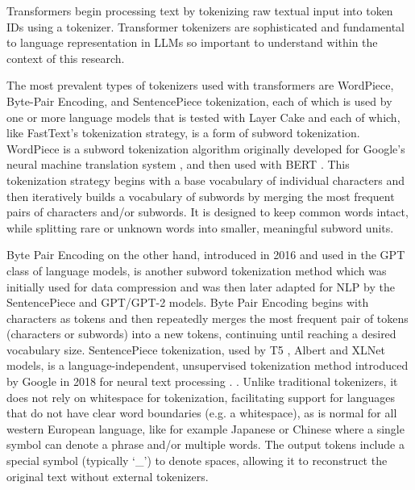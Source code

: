 \documentclass[final]{clv2025}
\begin{document}
Transformers begin processing text by tokenizing raw textual input into token IDs using a tokenizer. Transformer tokenizers are sophisticated and fundamental to language representation in LLMs so important to understand within the context of this research. 

The most prevalent types of tokenizers used with transformers are WordPiece, Byte-Pair Encoding, and SentencePiece tokenization, each of which is used by one or more language models that is tested with Layer Cake and each of which, like FastText’s tokenization strategy, is a form of subword tokenization. WordPiece is a subword tokenization algorithm originally developed for Google’s neural machine translation system \cite{schuster} \cite{wu}, and then used with BERT \cite{devlin-etal-2019-bert}. This tokenization strategy begins with a base vocabulary of individual characters and then iteratively builds a vocabulary of subwords by merging the most frequent pairs of characters and/or subwords. It is designed to keep common words intact, while splitting rare or unknown words into smaller, meaningful subword units. 

Byte Pair Encoding on the other hand, introduced in 2016 \cite{sennrich-etal-2016-neural} and used in the GPT class of language models, is another subword tokenization method which was initially used for data compression and was then later adapted for NLP by the SentencePiece and GPT/GPT-2 models. Byte Pair Encoding begins with characters as tokens and then repeatedly merges the most frequent pair of tokens (characters or subwords) into a new tokens, continuing until reaching a desired vocabulary size. SentencePiece tokenization, used by T5 \cite{raffel2019exploring}, Albert \cite{lan2019albert} and XLNet \cite{yang2019xlnet} models, is a language-independent, unsupervised tokenization method introduced by Google in 2018 for neural text processing \cite{kudo2018sentencepiece}. . Unlike traditional tokenizers, it does not rely on whitespace for tokenization, facilitating support for languages that do not have clear word boundaries (e.g. a whitespace), as is normal for all western European language, like for example Japanese or Chinese where a single symbol can denote a phrase and/or multiple words. The output tokens include a special symbol (typically ‘\_’) to denote spaces, allowing it to reconstruct the original text without external tokenizers.
\end{document}
